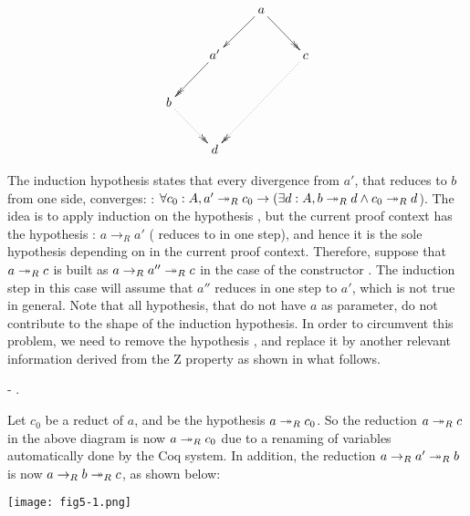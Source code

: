          \[\xymatrix{ & & a \ar@{->}[dl] \ar@{->>}[dr] & \\ & a'
        \ar@{->>}[dl] & & c \ar@{.>>}[ddll] \\ b \ar@{.>>}[dr] & & &
        \\ & d & & }\] 


        

        The induction hypothesis states that every divergence from
        $a'$, that reduces to $b$ from one side, converges: 
        : $\forall c_0 : A, a'\twoheadrightarrow_R c_0 \to (\exists d : A, b\twoheadrightarrow_R d
        \land c_0\twoheadrightarrow_R d$). The idea is to apply induction on the
        hypothesis , but the current proof context has the
        hypothesis : $a\to_R a'$ ( reduces to  in one step),
        and hence it is the sole hypothesis depending on  in the
        current proof context. Therefore, suppose that $a\twoheadrightarrow_R c$ is
        built as $a \to_R a'' \twoheadrightarrow_R c$ in the case of the constructor
        . The induction step in this case will assume that
        $a''$ reduces in one step to $a'$, which is not true in
        general. Note that all hypothesis, that do not have $a$ as
        parameter, do not contribute to the shape of the induction
        hypothesis. In order to circumvent this problem, we need to
        remove the hypothesis , and replace it by another relevant
        information derived from the Z property as shown in what
        follows. \begin{coqdoccode}
\coqdocemptyline
\coqdocindent{1.00em}
-   . \end{coqdoccode}
Let $c_0$ be a reduct of $a$, and 
    be the hypothesis $a \twoheadrightarrow_R c_0$. So the reduction $a\twoheadrightarrow_R c$ in
    the above diagram is now $a\twoheadrightarrow_R c_0$ due to a renaming of
    variables automatically done by the Coq system. In addition, the
    reduction $a \to_R a' \twoheadrightarrow_R b$ is now $a\to_R b \twoheadrightarrow_R c$, as
    shown below:


    \texttt{[image: fig5-1.png]}


